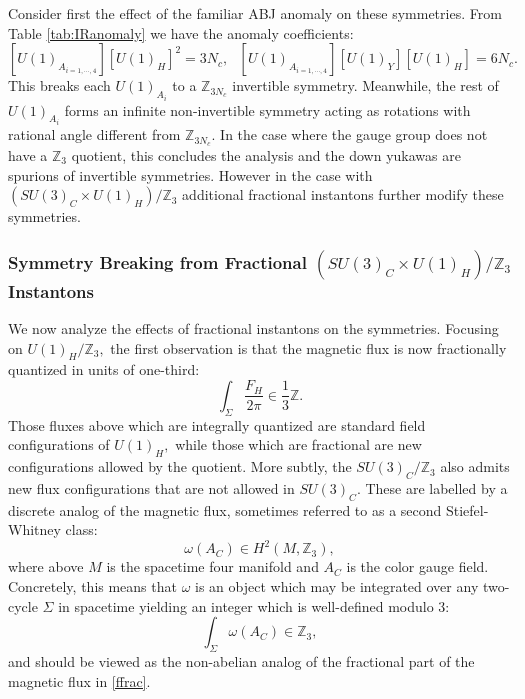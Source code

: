 \documentclass[11pt,a4paper]{article}
\begin{document}
Consider first the effect of the familiar ABJ anomaly on these symmetries.  From Table \ref{tab:IRanomaly} we have the anomaly coefficients:
\begin{equation}
    \left[ U(1)_{A_{i=1,\cdots, 4}} \right] \left[ U(1)_H \right]^2 = 3 N_c, ~~~  \left[ U(1)_{A_{i=1,\cdots, 4}} \right] \left[ U(1)_Y \right]\left[ U(1)_H \right]=6N_{c}.
\end{equation}
This breaks each $U(1)_{A_{i}}$ to a $\mathbb{Z}_{3N_c}$ invertible symmetry.  Meanwhile, the rest of $U(1)_{A_{i}}$ forms an infinite non-invertible symmetry acting as rotations with rational angle different from $\mathbb{Z}_{3N_c}$.  In the case where the gauge group does not have a $\mathbb{Z}_{3}$ quotient, this concludes the analysis and the down yukawas are spurions of invertible symmetries. However in the case with $\left(SU(3)_{C}\times U(1)_{H}\right)/\mathbb{Z}_{3}$ additional fractional instantons further modify these symmetries.

\subsubsection{Symmetry Breaking from Fractional \texorpdfstring{$\left(SU(3)_{C}\times U(1)_{H}\right)/\mathbb{Z}_{3}$}{} Instantons}

We now analyze the effects of fractional instantons on the symmetries.  Focusing on $U(1)_{H}/\mathbb{Z}_{3},$ the first observation is that  the magnetic flux is now fractionally quantized in units of one-third:
\begin{equation}\label{ffrac}
    \int_{\Sigma} \frac{F_{H}}{2\pi} \in \frac{1}{3}\mathbb{Z}.
\end{equation}
Those fluxes above which are integrally quantized are standard field configurations of $U(1)_{H},$ while those which are fractional are new configurations allowed by the quotient.   More subtly, the $SU(3)_{C}/\mathbb{Z}_{3}$ also admits new flux configurations that are not allowed in $SU(3)_{C}$.  These are labelled by a discrete analog of the magnetic flux, sometimes referred to as a second Stiefel-Whitney class:
\begin{equation}
\omega(A_{C})\in H^{2}(M,\mathbb{Z}_{3}),
\end{equation}
where above $M$ is the spacetime four manifold and $A_{C}$ is the color gauge field.  Concretely, this means that $\omega$ is an object which may be integrated over any two-cycle $\Sigma$ in spacetime yielding an integer which is well-defined modulo 3: 
\begin{equation}\label{w2is}
    \int_{\Sigma} \omega(A_{C}) \in \mathbb{Z}_{3},
\end{equation}
and should be viewed as the non-abelian analog of the fractional part of the magnetic flux in \eqref{ffrac}.  
\end{document}
